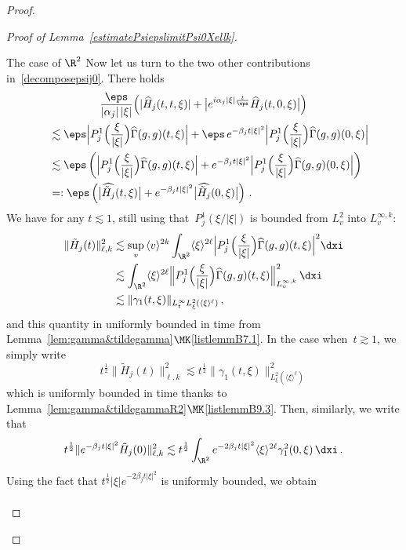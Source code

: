 \begin{proof}
\begin{proof}[{Proof of Lemma~\ref{estimatePsiepslimitPsi0Xellk}}]
\begin{step}{The case of $\R^2$}
Now let us turn to the two other contributions in~\eqref{decomposepsij0}. There holds
\begin{multline*}
\frac{\eps}{| \alpha_j|\, |\xi|} \Big(|\widehat H_j(t,t,\xi)|+ \big|e^{i \alpha_j|\xi|\frac{t}{\eps}} \widehat H_j(t,0,\xi) \big| \Big) \\
\begin{aligned}
&\quad \lesssim \eps \Big| P_{j}^1\Big(\frac{\xi}{|\xi|}\Big) \widehat {\Gamma}(g,g)(t,\xi) \Big| +\eps \, e^{- \beta_j t |\xi|^2} \Big| P_{j}^1\Big(\frac{\xi}{|\xi|}\Big) \widehat {\Gamma}(g,g)(0,\xi) \Big| \\
&\quad \lesssim \eps \left(\Big| P_{j}^1\Big(\frac{\xi}{|\xi|}\Big) \widehat {\Gamma}(g,g)(t,\xi) \Big| + e^{- \beta_j t |\xi|^2} \Big| P_{j}^1\Big(\frac{\xi}{|\xi|}\Big) \widehat {\Gamma}(g,g)(0,\xi) \Big| \right)\\
& \quad =: \eps \left(\big|\widehat {\tilde H_j} (t,\xi)\big| + e^{- \beta_j t |\xi|^2} \big|\widehat {\tilde H_j}(0,\xi)\big|\right) \,.
\end{aligned}
\end{multline*}
We have for any $t \lesssim 1$, still using that~$P_{j}^1(\xi/|\xi|)$ is bounded from $L^2_v$ into $L^{\infty,k}_v$:
\begin{align*}
\| {\tilde H_j} (t) \|^2_{\ell,k} &\lesssim \sup_v \, \langle v \rangle^{2k} \int_{\R^2} \langle \xi \rangle^{2\ell} \Big| P_{j}^1\Big(\frac{\xi}{|\xi|}\Big) \widehat {\Gamma}(g,g)(t,\xi) \Big|^2 \dxi \\
&\lesssim \int_{\R^2} \langle \xi \rangle^{2\ell} \Big\| P_{j}^1\Big(\frac{\xi}{|\xi|}\Big) \widehat {\Gamma}(g,g)(t,\xi) \Big\|^2_{L^{\infty,k}_v} \, \dxi \\
&\lesssim \|\gamma_1(t,\xi)\|_{L^\infty_t L^2_\xi(\langle \xi \rangle^\ell)} \,,
\end{align*}
and this quantity in uniformly bounded in time from Lemma~\ref{lem:gamma&tildegamma}$\MK$\eqref{listlemmB7.1}. In the case when~$t \gtrsim 1$, we simply write
\[
t^{\frac12} \|\tilde H_j(t) \|^2_{\ell,k} \lesssim t^{\frac12} {\|\gamma_1(t,\xi) \|_{L^2_\xi(\langle \xi \rangle^\ell)}^2}
\]
which is uniformly bounded in time thanks to Lemma~\ref{lem:gamma&tildegammaR2}$\MK$\eqref{listlemmB9.3}. Then, similarly, we write that
\[
t^{\frac12}\|e^{- \beta_j t |\xi|^2}\tilde H_j(0) \|^2_{\ell,k} \lesssim t^{\frac12} \int_{\R^2} e^{-2\beta_j t |\xi|^2} \langle \xi \rangle^{2\ell} \gamma_1^2(0,\xi) \, \dxi \,.
\]
Using the fact that $t^{\frac12} |\xi| e^{- 2\beta_j t |\xi|^2}$ is uniformly bounded, we obtain
\begin{align*}

\end{align*}
\end{step}
\end{proof}
\end{proof}
